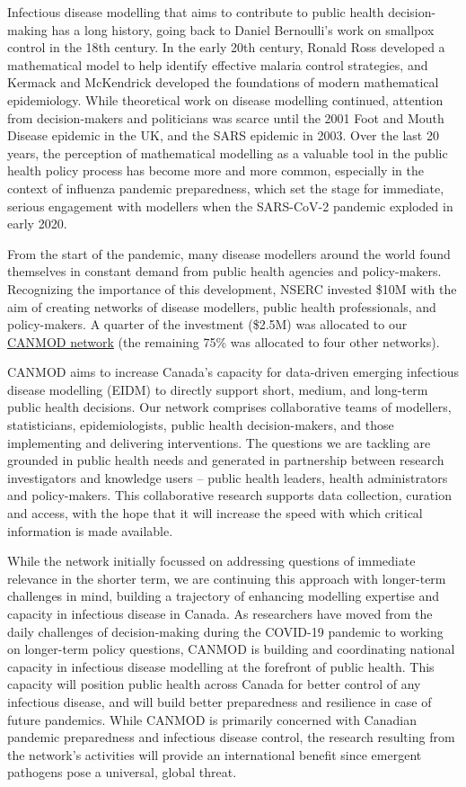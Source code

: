 
Infectious disease modelling that aims to contribute to public health
decision-making has a long history, going back to Daniel Bernoulli’s
work on smallpox control in the 18th century.  In the early 20th
century, Ronald Ross developed a mathematical model to help identify
effective malaria control strategies, and Kermack and McKendrick
developed the foundations of modern mathematical epidemiology.  While
theoretical work on disease modelling continued, attention from
decision-makers and politicians was scarce until the 2001 Foot and
Mouth Disease epidemic in the UK, and the SARS epidemic in 2003.  Over
the last 20 years, the perception of mathematical modelling as a
valuable tool in the public health policy process has become more and
more common, especially in the context of influenza pandemic
preparedness, which set the stage for immediate, serious engagement
with modellers when the SARS-CoV-2 pandemic exploded in early 2020.

From the start of the pandemic, many disease modellers around the
world found themselves in constant demand from public health agencies
and policy-makers.  Recognizing the importance of this development,
NSERC invested \$10M with the aim of creating networks of disease
modellers, public health professionals, and policy-makers.  A quarter of
the investment (\$2.5M) was allocated to our
\href{https://canmod.net/}{CANMOD network} (the remaining 75\% was
allocated to four other networks).

CANMOD aims to increase Canada’s capacity for data-driven emerging
infectious disease modelling (EIDM) to directly support short, medium,
and long-term public health decisions. Our network comprises
collaborative teams of modellers, statisticians, epidemiologists,
public health decision-makers, and those implementing and delivering
interventions. The questions we are tackling are grounded in public
health needs and generated in partnership between research
investigators and knowledge users -- public health leaders, health
administrators and policy-makers. This collaborative research supports
data collection, curation and access, with the hope that it will
increase the speed with which critical information is made available.


While the network initially focussed on addressing questions of
immediate relevance in the shorter term, we are continuing this
approach with longer-term challenges in mind, building a trajectory of
enhancing modelling expertise and capacity in infectious disease in
Canada. As researchers have moved from the daily challenges of
decision-making during the COVID-19 pandemic to working on longer-term
policy questions, CANMOD is building and coordinating national
capacity in infectious disease modelling at the forefront of public
health. This capacity will position public health across Canada for
better control of any infectious disease, and will build better
preparedness and resilience in case of future pandemics. While CANMOD
is primarily concerned with Canadian pandemic preparedness and
infectious disease control, the research resulting from the network’s
activities will provide an international benefit since emergent
pathogens pose a universal, global threat.

